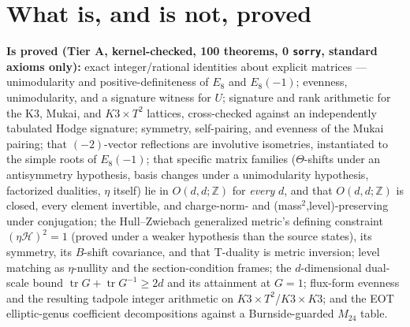\documentclass[11pt,a4paper]{article}
\theoremstyle{remark}
\begin{document}
\section{What is, and is not, proved}
\label{sec:scope}

\begin{scopebox}
\textbf{Is proved (Tier A, kernel-checked, 100 theorems, 0 \texttt{sorry}, standard axioms only):}
exact integer/rational identities about explicit matrices --- unimodularity and
positive-definiteness of $E_8$ and $E_8(-1)$; evenness, unimodularity, and a signature witness for
$U$; signature and rank arithmetic for the K3, Mukai, and $K3\times T^2$ lattices, cross-checked
against an independently tabulated Hodge signature; symmetry, self-pairing, and evenness of the
Mukai pairing; that $(-2)$-vector reflections are involutive isometries, instantiated to the
simple roots of $E_8(-1)$; that specific matrix families ($\Theta$-shifts under an antisymmetry
hypothesis, basis changes under a unimodularity hypothesis, factorized dualities, $\eta$ itself)
lie in $O(d,d;\mathbb{Z})$ for \emph{every} $d$, and that $O(d,d;\mathbb{Z})$ is closed, every
element invertible, and charge-norm- and (mass$^2$,level)-preserving under conjugation; the
Hull--Zwiebach generalized metric's defining constraint $(\eta\mathcal{H})^2=1$ (proved under a
weaker hypothesis than the source states), its symmetry, its $B$-shift covariance, and that
T-duality is metric inversion; level matching as $\eta$-nullity and the section-condition
frames; the $d$-dimensional dual-scale bound $\operatorname{tr}G+\operatorname{tr}G^{-1}\ge 2d$
and its attainment at $G=1$; flux-form evenness and the resulting tadpole integer arithmetic on
$K3\times T^2$/$K3\times K3$; and the EOT elliptic-genus coefficient decompositions against a
Burnside-guarded $M_{24}$ table.


\end{scopebox}
\end{document}
